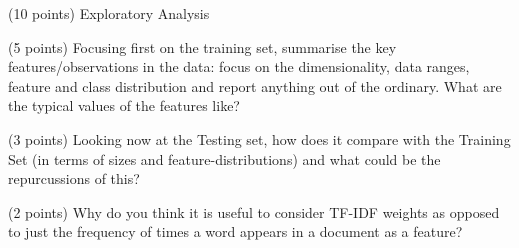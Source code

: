 \documentclass[12pt]{article}
\begin{document}
\maketitle
\thispagestyle{empty}









\begin{question}{(10 points) Exploratory Analysis}




\begin{subquestion}{(5 points) Focusing first on the training set, summarise the key features/observations in the data: focus on the dimensionality, data ranges, feature and class distribution and report anything out of the ordinary. What are the typical values of the features like?}





\end{subquestion}


\begin{subquestion}{(3 points) Looking now at the Testing set, how does it compare with the Training Set (in terms of sizes and feature-distributions) and what could be the repurcussions of this?}





\end{subquestion}

\begin{subquestion}{(2 points) Why do you think it is useful to consider TF-IDF weights as opposed to just the frequency of times a word appears in a document as a feature?}






\end{subquestion}



\end{question}
\end{document}
